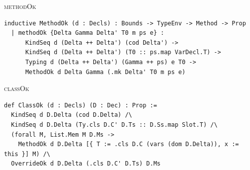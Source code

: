 \begin{cmp}{\textsc{methodOk}}
\begin{paperside}
\end{paperside}
\begin{leanside}
\begin{lstlisting}[style=leanside]
inductive MethodOk (d : Decls) : Bounds -> TypeEnv -> Method -> Prop
  | methodOk {Delta Gamma Delta' T0 m ps e} :
      KindSeq d (Delta ++ Delta') (cod Delta') ->
      KindSeq d (Delta ++ Delta') (T0 :: ps.map VarDecl.T) ->
      Typing d (Delta ++ Delta') (Gamma ++ ps) e T0 ->
      MethodOk d Delta Gamma (.mk Delta' T0 m ps e)
\end{lstlisting}
\end{leanside}
\end{cmp}

\begin{cmp}{\textsc{classOk}}
\begin{paperside}
\end{paperside}
\begin{leanside}
\begin{lstlisting}[style=leanside]
def ClassOk (d : Decls) (D : Dec) : Prop :=
  KindSeq d D.Delta (cod D.Delta) /\
  KindSeq d D.Delta (Ty.cls D.C' D.Ts :: D.Ss.map Slot.T) /\
  (forall M, List.Mem M D.Ms ->
    MethodOk d D.Delta [{ T := .cls D.C (vars (dom D.Delta)), x := this }] M) /\
  OverrideOk d D.Delta (.cls D.C' D.Ts) D.Ms
\end{lstlisting}
\end{leanside}
\end{cmp}

